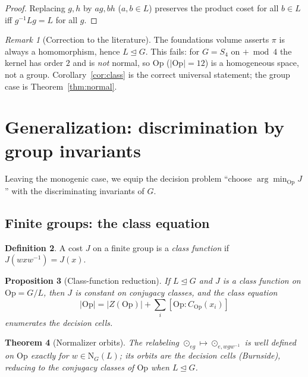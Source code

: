 \documentclass[11pt,a4paper]{article}
\newcommand{\Op}{\mathrm{Op}}
\newcommand{\Norm}{\mathrm{N}}
\theoremstyle{plain}
\newtheorem{theorem}{Theorem}
\newtheorem{proposition}[theorem]{Proposition}
\theoremstyle{definition}
\newtheorem{definition}[theorem]{Definition}
\theoremstyle{remark}
\newtheorem{remark}[theorem]{Remark}
\begin{document}
\begin{proof}
Replacing $g,h$ by $ag,bh$ ($a,b\in L$) preserves the product coset for all
$b\in L$ iff $g^{-1}Lg=L$ for all $g$.
\end{proof}

\begin{remark}[Correction to the literature]\label{rem:correction}
The foundations volume asserts $\pi$ is always a homomorphism, hence
$L\trianglelefteq G$. This fails: for $G=S_4$ on $+\bmod 4$ the kernel has order
$2$ and is \emph{not} normal, so $\Op$ ($|\Op|=12$) is a homogeneous space, not
a group. Corollary~\ref{cor:class} is the correct universal statement; the group
case is Theorem~\ref{thm:normal}.
\end{remark}

\section{Generalization: discrimination by group invariants}
\label{sec:general}

Leaving the monogenic case, we equip the decision problem
``choose $\arg\min_\Op J$'' with the discriminating invariants of $G$.

\subsection{Finite groups: the class equation}

\begin{definition}
A cost $J$ on a finite group is a \emph{class function} if $J(wxw^{-1})=J(x)$.
\end{definition}

\begin{proposition}[Class-function reduction]\label{prop:classfn}
If $L\trianglelefteq G$ and $J$ is a class function on $\Op=G/L$, then $J$ is
constant on conjugacy classes, and the class equation
\begin{equation}\label{eq:classeq}
|\Op|=|Z(\Op)|+\sum_i[\Op:C_\Op(x_i)]
\end{equation}
enumerates the decision cells.
\end{proposition}

\begin{theorem}[Normalizer orbits]\label{thm:orbits}
The relabeling $\odot_{eg}\mapsto\odot_{e,wgw^{-1}}$ is well defined on $\Op$
exactly for $w\in\Norm_G(L)$; its orbits are the decision cells (Burnside),
reducing to the conjugacy classes of $\Op$ when $L\trianglelefteq G$.
\end{theorem}
\end{document}
